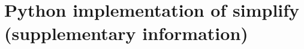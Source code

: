 \documentclass{article}
\newcommand{\simupop}{\texttt{simuPOP}}
\newcommand{\msprime}{\texttt{msprime}}
\newcommand{\ftprime}{\texttt{ftprime}}
\newcommand{\jda}[1]{{\em \color{cyan} #1}}
\begin{document}
%
%

\newpage

\section*{Python implementation of simplify (supplementary information)}


\end{document}
